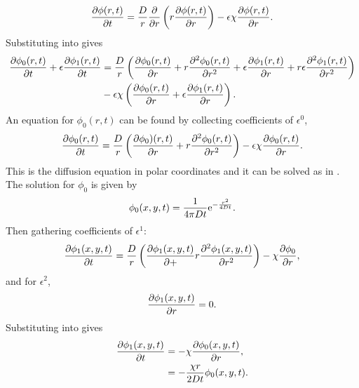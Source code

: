 %
\begin{equation}
  \frac{\partial \phi(r,t)}{\partial t} = \frac{D}{r} \frac{\partial }{\partial r}\left(r \frac{\partial \phi(r,t)}{\partial r} \right) - \epsilon\chi \frac{\partial \phi(r,t)}{\partial r}.
  \label{eqn:convection_perturbation}
\end{equation}
%
Substituting  into  gives
%
\begin{equation}
\begin{split}
  \frac{\partial \phi_0(r,t)}{\partial t} + \epsilon\frac{\partial \phi_1(r,t)}{\partial t} &= \frac{D}{r} \left( \frac{\partial \phi_0(r,t)}{\partial r} + r \frac{\partial^2 \phi_0(r,t)}{\partial r^2} + \epsilon\frac{\partial \phi_1(r,t)}{\partial r} + r\epsilon \frac{\partial^2 \phi_1(r,t)}{\partial r^2}\right)  \\
  &- \epsilon\chi \left( \frac{\partial \phi_0(r,t)}{\partial r} + \epsilon \frac{\partial \phi_1(r,t)}{\partial r} \right) .
  \end{split}
\end{equation}
%
An equation for $\phi_0(r,t)$ can be found by collecting coefficients of $\epsilon^0$,
%
\begin{equation}
  \frac{\partial \phi_0(r,t)}{\partial t} = \frac{D}{r} \left(\frac{\partial \phi_0)(r,t)}{\partial r} + r\frac{\partial^2 \phi_0(r,t)}{\partial r^2}\right) - \epsilon\chi \frac{\partial \phi_0(r,t)}{\partial r}.
  \label{eqn:diffusion_eps0}
\end{equation}
%
This is the diffusion equation in polar coordinates and it can be solved as in . The solution for $\phi_0$ is given by
%
\begin{equation}
  \phi_0(x,y,t) = \frac{1}{4\pi Dt}\mathrm{e}^{-\frac{r^2}{4Dt}}.\\
  \label{eqn:phi_0}
\end{equation}
%
Then gathering coefficients of $\epsilon^1$:
%
\begin{equation}
\frac{\partial \phi_1(x,y,t)}{\partial t} = \frac{D}{r}\left(\frac{\partial \phi_1(x,y,t)}{\partial +} r \frac{\partial^2 \phi_1(x,y,t)}{\partial r^2}\right) - \chi\frac{\partial \phi_0}{\partial r},
\label{eqn:eps1}
\end{equation}
%
and for $\epsilon^2$,
%
\begin{equation}
\frac{\partial \phi_1(x,y,t)}{\partial r} = 0 .
\label{eqn:eps2}
\end{equation}
%
Substituting  into  gives
%
\begin{equation}
\begin{split}
  \frac{\partial \phi_1(x,y,t)}{\partial t} &= - \chi\frac{\partial \phi_0(x,y,t)}{\partial r}, \\
                       &= - \frac{\chi r}{2Dt} \phi_0(x,y,t) .
\end{split}
\end{equation}
